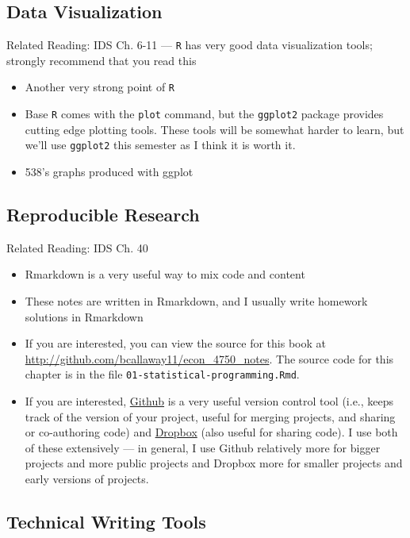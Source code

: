 \documentclass[
  letterpaper,
  DIV=11,
  numbers=noendperiod]{scrreprt}
\begin{document}
\subsection{Data Visualization}\label{data-visualization}

Related Reading: IDS Ch. 6-11 --- \texttt{R} has very good data
visualization tools; strongly recommend that you read this

\begin{itemize}
\item
  Another very strong point of \texttt{R}
\item
  Base \texttt{R} comes with the \texttt{plot} command, but the
  \texttt{ggplot2} package provides cutting edge plotting tools. These
  tools will be somewhat harder to learn, but we'll use \texttt{ggplot2}
  this semester as I think it is worth it.
\item
  538's graphs produced with ggplot
\end{itemize}

\subsection{Reproducible Research}\label{reproducible-research}

Related Reading: IDS Ch. 40

\begin{itemize}
\item
  Rmarkdown is a very useful way to mix code and content
\item
  These notes are written in Rmarkdown, and I usually write homework
  solutions in Rmarkdown
\item
  If you are interested, you can view the source for this book at
  \url{http://github.com/bcallaway11/econ_4750_notes}. The source code
  for this chapter is in the file
  \texttt{01-statistical-programming.Rmd}.
\item
  If you are interested, \href{http://github.com}{Github} is a very
  useful version control tool (i.e., keeps track of the version of your
  project, useful for merging projects, and sharing or co-authoring
  code) and \href{http://dropbox.com}{Dropbox} (also useful for sharing
  code). I use both of these extensively --- in general, I use Github
  relatively more for bigger projects and more public projects and
  Dropbox more for smaller projects and early versions of projects.
\end{itemize}

\subsection{Technical Writing Tools}\label{technical-writing-tools}
\end{document}
